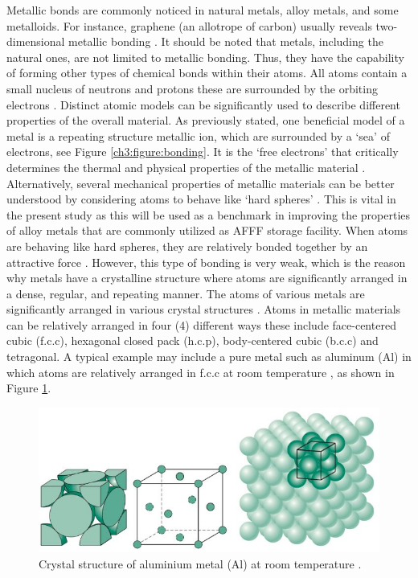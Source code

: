 \documentclass[12pt]{report}
\begin{document}
Metallic bonds are commonly noticed in natural metals, alloy metals, and some metalloids. For instance, graphene (an allotrope of carbon) usually reveals two-dimensional metallic bonding \cite{lepetit2017topological}. It should be noted that metals, including the natural ones, are not limited to metallic bonding. Thus, they have the capability of forming other types of chemical bonds within their atoms.
All atoms contain a small nucleus of neutrons and protons these are surrounded by the orbiting electrons \cite{hench2005biomaterials}. Distinct atomic models can be significantly used to describe different properties of the overall material. As previously stated, one beneficial model of a metal is a repeating structure metallic ion, which are surrounded by a ‘sea’ of electrons, see Figure \ref{ch3:figure:bonding}. It is the ‘free electrons’ that critically determines the thermal and physical properties of the metallic material \cite{hench2005biomaterials}. Alternatively, several mechanical properties of metallic materials can be better understood by considering atoms to behave like ‘hard spheres’ \cite{hench2005biomaterials}. This is vital in the present study as this will be used as a benchmark in improving the properties of alloy metals that are commonly utilized as AFFF storage facility.
When atoms are behaving like hard spheres, they are relatively bonded together by an attractive force \cite{lepetit2017topological}. However, this type of bonding is very weak, which is the reason why metals have a crystalline structure where atoms are significantly arranged in a dense, regular, and repeating manner. The atoms of various metals are significantly arranged in various crystal structures \cite{hench2005biomaterials}. Atoms in metallic materials can be relatively arranged in four (4) different ways these include face-centered cubic (f.c.c), hexagonal closed pack (h.c.p), body-centered cubic (b.c.c) and tetragonal. A typical example may include a pure metal such as aluminum (Al) in which atoms are relatively arranged in f.c.c at room temperature \cite{hench2005biomaterials}, as shown in Figure \ref{ch3:figure:aluminium}.
 
\begin{figure}[H]
    \centering
    \includegraphics[width=\textwidth]{aluminium_crystal_structure.jpg}
    \caption{Crystal structure of aluminium metal (Al) at room temperature \cite{hench2005biomaterials}.}
    \label{ch3:figure:aluminium}
\end{figure}
\end{document}
